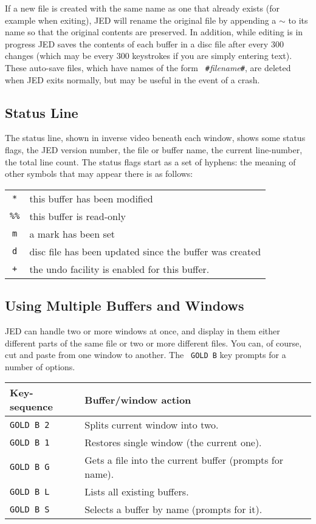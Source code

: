 If a new file is created with the same name as one that already exists
(for example when exiting), JED will rename the original file by
appending a $\sim$ to its name so that the original contents are
preserved. In addition, while editing is in progress JED saves the
contents of each buffer in a disc file after every 300 changes (which may
be every 300 keystrokes if you are simply entering text). These auto-save
files, which have names of the form {\tt
\#}{\em filename}{\tt \#}, are deleted when JED exits
normally, but may be useful in the event of a crash.

\subsection{Status Line}

The status line, shown in inverse video beneath each window, shows some
status flags, the JED version number, the file or buffer name, the
current line-number, the total line count.  The status flags start as a
set of hyphens: the meaning of other symbols that may appear there is as
follows:

\begin{tabular}{cl}
{\tt **}   & this buffer has been modified \\
{\tt \%\%} & this buffer is read-only \\
{\tt m}    & a mark has been set \\
{\tt d}    & disc file has been updated since the buffer was created \\
{\tt +}    & the undo facility is enabled for this buffer. \\
\end{tabular}

\subsection{Using Multiple Buffers and Windows}

JED can handle two or more windows at once, and display in them either
different parts of the same file or two or more different files.  You
can, of course, cut and paste from one window to another. The {\tt
GOLD B} key prompts for a number of options.

\begin{center}
\begin{tabular}{|ll|}
\hline
Key-sequence & Buffer/window action \\
\hline
{\tt GOLD B 2} & Splits current window into two.\\
{\tt GOLD B 1} & Restores single window (the current one).\\
{\tt GOLD B G} & Gets a file into the current buffer (prompts for name).\\
{\tt GOLD B L} & Lists all existing buffers.\\
{\tt GOLD B S} & Selects a buffer by name (prompts for it).\\
\hline
\end{tabular}
\end{center}

